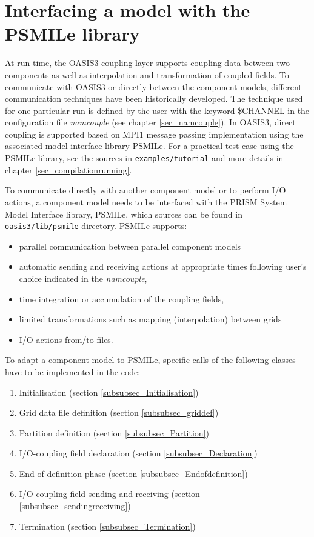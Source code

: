 \newpage
\chapter{Interfacing a model with the PSMILe library}
\label{sec_modelinterfacing}

At run-time, the OASIS3 coupling layer supports coupling data
between two components as well as interpolation and transformation
of coupled fields. To communicate with OASIS3 or directly between the component
models, different communication techniques have been historically
developed. The technique used for one particular run is defined by the
user with the keyword \$CHANNEL in the configuration file {\it namcouple} 
(see chapter
\ref{sec_namcouple}). In OASIS3, direct coupling is supported 
based on MPI1 message passing implementation
using the associated model interface library PSMILe.  For
a practical test case using the PSMILe library, see the sources in
{\tt examples/tutorial} and more details in
chapter \ref{sec_compilationrunning}.

 To communicate directly with another component model
  or to perform I/O actions, a component model needs to be interfaced
  with the PRISM System Model Interface library, PSMILe, which sources
  can be found in {\tt oasis3/lib/psmile} directory. PSMILe supports:

\begin{itemize}
\item parallel communication between parallel component models
\item automatic sending and receiving actions at appropriate times
 following user's choice indicated in the {\it namcouple},
\item time integration or accumulation of the coupling fields,
\item limited transformations such as mapping (interpolation) between grids
\item I/O actions from/to files.
\end{itemize}

 To adapt a component model to PSMILe, specific calls of
 the following classes have to be implemented in the code:

\begin{enumerate}
\item Initialisation (section \ref{subsubsec_Initialisation})
\item Grid data file definition (section \ref{subsubsec_griddef})
\item Partition definition (section \ref{subsubsec_Partition})
\item I/O-coupling field declaration (section \ref{subsubsec_Declaration})
\item End of definition phase (section \ref{subsubsec_Endofdefinition})
\item I/O-coupling field sending and receiving (section
\ref{subsubsec_sendingreceiving})
\item Termination (section \ref{subsubsec_Termination})
\end{enumerate}

